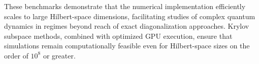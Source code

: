 These benchmarks demonstrate that the numerical implementation efficiently scales to large Hilbert-space dimensions, facilitating studies of complex quantum dynamics in regimes beyond reach of exact diagonalization approaches. Krylov subspace methods, combined with optimized GPU execution, ensure that simulations remain computationally feasible even for Hilbert-space sizes on the order of $10^8$ or greater.







